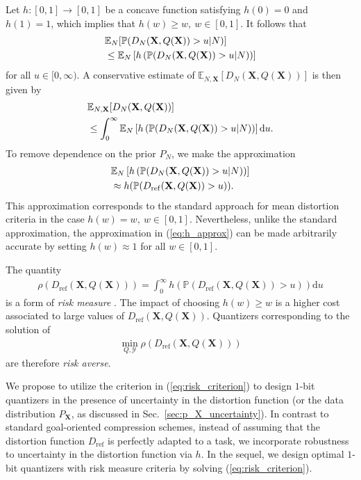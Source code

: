 \documentclass[journal]{IEEEtran}
\begin{document}
Let $h: [0,1] \rightarrow [0,1]$ be a concave function satisfying $h(0) = 0$ and $h(1) = 1$, which implies that $h(w) \geq w,~w \in [0,1]$. It follows that
\begin{align}
	&\mathbb{E}_N[\mathbb{P}(D_N(\mathbf{X},Q(\mathbf{X})) > u|N)]\notag\\
	&\leq \mathbb{E}_N\left[h\left(\mathbb{P}(D_N(\mathbf{X},Q(\mathbf{X})) > u|N)\right)\right]
\end{align}
for all $u \in [0,\infty)$. A conservative estimate of $\mathbb{E}_{N,\mathbf{X}}[D_N(\mathbf{X},Q(\mathbf{X}))]$ is then given by 
\begin{align}
	&\mathbb{E}_{N,\mathbf{X}}[D_N(\mathbf{X},Q(\mathbf{X}))]\notag\\ 
	&\leq \int_0^{\infty} \mathbb{E}_N\left[h\left(\mathbb{P}(D_N(\mathbf{X},Q(\mathbf{X})) > u|N)\right)\right]\mathrm{d}u.
\end{align}
To remove dependence on the prior $P_N$, we make the approximation 
\begin{align}\label{eq:h_approx}
	&\mathbb{E}_N\left[h\left(\mathbb{P}(D_N(\mathbf{X},Q(\mathbf{X})) > u|N)\right)\right]\notag\\
	&\approx h(\mathbb{P}(D_{\mathrm{ref}}(\mathbf{X},Q(\mathbf{X})) > u)).
\end{align}
This approximation corresponds to the standard approach for mean distortion criteria in the case $h(w) = w,~w \in [0,1]$. Nevertheless, unlike the standard approximation, the approximation in (\ref{eq:h_approx}) can be made arbitrarily accurate by setting $h(w) \approx 1$ for all $w \in [0,1]$. 

The quantity 
\begin{align}
	\rho(D_{\mathrm{ref}}(\mathbf{X},Q(\mathbf{X}))) = \int_0^{\infty} h(\mathbb{P}(D_{\mathrm{ref}}(\mathbf{X},Q(\mathbf{X})) > u))\mathrm{d}u
\end{align}
is a form of \textit{risk measure} \cite{Serada2010distortion}. The impact of choosing $h(w) \geq w$ is a higher cost associated to large values of $D_{\mathrm{ref}}(\mathbf{X},Q(\mathbf{X}))$. Quantizers corresponding to the solution of 
\begin{align}\label{eq:risk_criterion}
	\min_{Q,\mathcal{Y}} 	\rho(D_{\mathrm{ref}}(\mathbf{X},Q(\mathbf{X})))
\end{align} 
are therefore \textit{risk averse}. 

We propose to utilize the criterion in (\ref{eq:risk_criterion}) to design $1$-bit quantizers in the presence of uncertainty in the distortion function (or the data distribution $P_{\mathbf{X}}$, as discussed in Sec.~\ref{sec:p_X_uncertainty}). In contrast to standard goal-oriented compression schemes, instead of assuming that the distortion function $D_{\mathrm{ref}}$ is perfectly adapted to a task, we incorporate robustness to uncertainty in the distortion function via $h$. In the sequel, we design optimal $1$-bit quantizers with risk measure criteria by solving (\ref{eq:risk_criterion}). 
\end{document}
